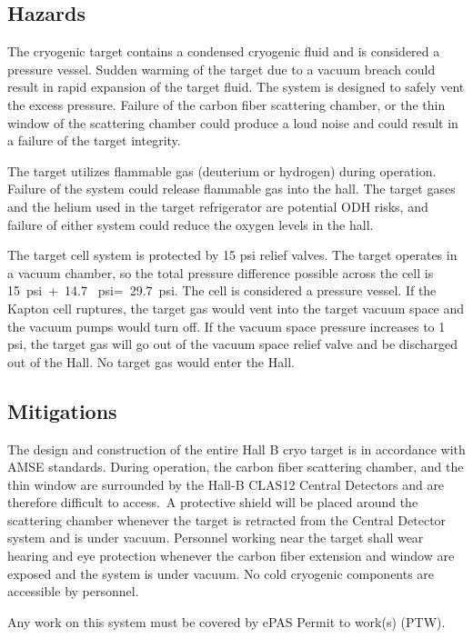   \subsection{Hazards} 

The cryogenic target contains a condensed cryogenic fluid and is considered a pressure vessel. Sudden warming of the target due to a vacuum breach could result in rapid expansion of the target fluid. The system is designed to safely vent the excess pressure. Failure of the carbon fiber scattering chamber, or the thin window of the scattering chamber could produce a loud noise and could result in a failure of the target integrity.

The target utilizes flammable gas (deuterium or hydrogen) during operation. Failure of the system could release flammable gas into the hall. The target gases and the helium used in the target refrigerator are potential ODH risks, and failure of either system could reduce the oxygen levels in the hall.

The target cell system is protected by 15 psi relief valves.  The target operates in a vacuum chamber, so the total pressure difference possible across the cell is 15~psi~+~14.7 ~psi=~29.7~psi. The cell is considered a pressure vessel. If the Kapton cell ruptures, the target gas would vent into the target vacuum space and the vacuum pumps would turn off. If the vacuum space pressure increases to 1 psi, the target gas will go out of the vacuum space relief valve and be discharged out of the Hall. No target gas would enter the Hall.

\subsection{Mitigations}

The design and construction of the entire Hall B cryo target is in accordance with AMSE standards. During operation, the carbon fiber scattering chamber, and the thin window are surrounded by the Hall-B CLAS12 Central Detectors and are therefore difficult to access.~A protective shield will be placed around the scattering chamber whenever the target is retracted from the Central Detector system and is under vacuum.  Personnel working near the target shall wear hearing and eye protection whenever the carbon fiber extension and window are exposed and the system is under vacuum. No cold cryogenic components are accessible by personnel.

Any work on this system must be covered by ePAS Permit to work(s) (PTW).

